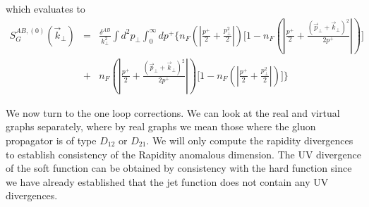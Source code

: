 \documentclass[letter,11pt]{article}
\newcommand{\nn}{\nonumber}
\newcommand{\bea}{\begin{eqnarray}}
\newcommand{\eea}{\end{eqnarray}}
\def\nn{\nonumber}
\begin{document}
which evaluates to 
\bea
S_G^{AB,(0)}(\vec{k}_{\perp})&=& \frac{\delta^{AB}}{k_{\perp}^2} \int d^2p_{\perp}\int_0^{\infty} dp^+ \Bigg\{n_F\left(|\frac{p^+}{2}+\frac{p_{\perp}^2}{2}|\right)\Big[1-n_F(|\frac{p^+}{2}+\frac{(\vec{p}_{\perp}+\vec{k}_{\perp})^2}{2p^+}|)\Big]\nn\\
&+&n_F(|\frac{p^+}{2}+\frac{(\vec{p}_{\perp}+\vec{k}_{\perp})^2}{2p^+}|)\Big[1-n_F\left(|\frac{p^+}{2}+\frac{p_{\perp}^2}{2}|\right)\Big]\Bigg\}\nn
\eea

We now turn to the one loop corrections. 	We can look at the real and virtual graphs separately, where by real graphs we mean those where the gluon propagator is of type $D_{12}$ or $D_{21}$. We will only compute the rapidity divergences to establish consistency of the Rapidity anomalous dimension. The UV divergence of the soft function can be obtained by consistency with the hard function since we have already established that the jet function does not contain any UV divergences.
\end{document}
